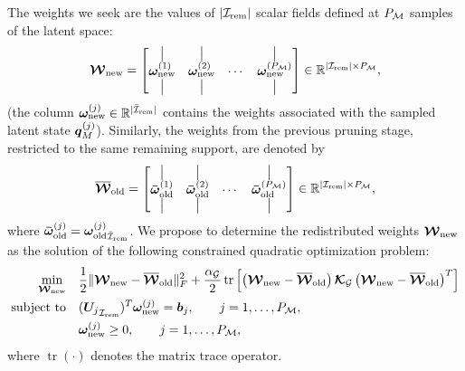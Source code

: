 \documentclass[preprint,10pt]{elsarticle}  %
\begin{document}
 The  weights we seek are the values of $|\Irem|$ scalar fields defined at $\nM$ samples of the latent space:
\begin{equation}
\Wnew
=
\begin{bmatrix}
\label{eq:wnew}
\big| & \big| &        & \big| \\
\wnew{1} & \wnew{2} & \cdots & \wnew{\nM} \\
\big| & \big| &        & \big|
\end{bmatrix}
\in
\mathbb{R}^{|\Irem|\times\nM},
\end{equation}
(the column
\(\wnew{j}\in\mathbb{R}^{|\IremLOC|}\) contains the   weights
associated with the sampled latent state \(\qMj{j}\)). Similarly, the weights from the previous pruning stage, restricted to
the same remaining support, are denoted by
\[
\Woldrem
=
\begin{bmatrix}
\big| & \big| &        & \big| \\
\woldrem{1} & \woldrem{2} & \cdots & \woldrem{\nM} \\
\big| & \big| &        & \big|
\end{bmatrix}
\in
\mathbb{R}^{|\Irem|\times\nM},
\]
where $\woldrem{j} = \woldremDEF{j}$.  We propose to determine the redistributed weights $\Wnew$ as the solution of the
following constrained quadratic optimization problem:
\begin{equation}
 \label{eq:quadraticGENERAL}
\begin{aligned}
\min_{\Wnew}\quad
&
\frac12
\|
\Wnew-\Woldrem
\|_F^2
+
\frac{\alphaG}{2}
\operatorname{tr}
\left[
\left(\Wnew-\Woldrem\right)
\KGs
\left(\Wnew-\Woldrem\right)^T
\right]
\\
\text{subject to}\quad
&
\UremDEFt{j}\wnew{j}
=
\bj{j},
\qquad
j=1,\ldots,\nM,
\\
&
\wnew{j}\ge0,
\qquad
j=1,\ldots,\nM,
\end{aligned}
\end{equation}
where \(\operatorname{tr}(\cdot)\) denotes the matrix trace operator. %
\end{document}
